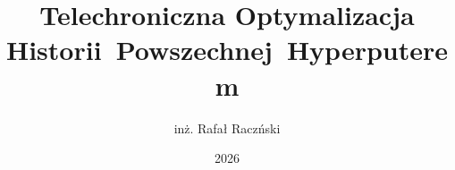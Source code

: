 \documentclass[thesis=inz,faculty=ee]{EE-dyplom}
\title{Telechroniczna Optymalizacja Historii~Powszechnej~Hyperputerem}
\author{inż. Rafał Raczński}
\date{2026}
\begin{document}
    \frontpages
    

	
	
	
	

    \bibliografia

    
    \acronymslist
    \listoffigures
    \listoftables
    \easyappendices
\end{document}
